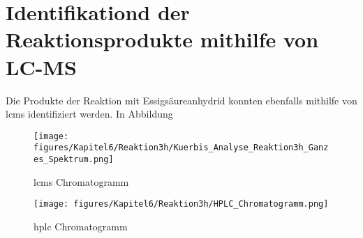 \section{Identifikationd der Reaktionsprodukte mithilfe von LC-MS}

Die Produkte der Reaktion mit Essigsäureanhydrid konnten ebenfalls mithilfe von \gls{lcms} identifiziert werden. In Abbildung 

\begin{figure}[!htbp]
  \texttt{[image: figures/Kapitel6/Reaktion3h/Kuerbis\_Analyse\_Reaktion3h\_Ganzes\_Spektrum.png]}
  \caption[LC-MS Chromatogramm nach 3h Reaktionsdauer, Quelle: Author]{\gls{lcms} Chromatogramm}
  \label{fig:LCMSCChromatogrammRP}
\end{figure}


\begin{figure}[!htbp]
  \texttt{[image: figures/Kapitel6/Reaktion3h/HPLC\_Chromatogramm.png]}
  \caption[HPLC Chromatogramm nach 3h Reaktionsdauer, Quelle: Author]{\gls{hplc} Chromatogramm}
  \label{fig:HPLCChromatogrammRP}
\end{figure}
